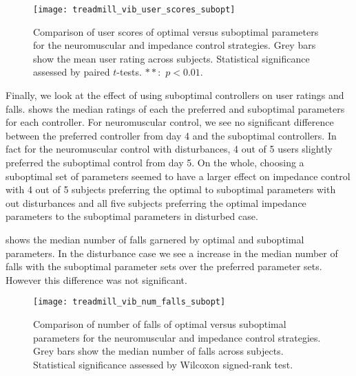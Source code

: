 \begin{figure}[t]
    \centering 
    \texttt{[image: treadmill\_vib\_user\_scores\_subopt]}
    \caption{Comparison of user scores of optimal versus suboptimal parameters
    for the neuromuscular and impedance control strategies. Grey bars show the
    mean user rating across subjects. Statistical significance assessed by
    paired $t$-tests. $**$:~$p <
    0.01$.}\label{fig:treadmill_exp_user_ratings_subopt}
\end{figure}
Finally, we look at the effect of using suboptimal controllers on user ratings
and falls.  shows the median ratings of
each the preferred and suboptimal parameters for each controller. For
neuromuscular control, we see no significant difference between the preferred
controller from day 4 and the suboptimal controllers. In fact for the
neuromuscular control with disturbances, 4 out of 5 users slightly preferred the
suboptimal control from day 5. On the whole, choosing a suboptimal set of
parameters seemed to have a larger effect on impedance control with 4 out of 5
subjects preferring the optimal to suboptimal parameters with out disturbances
and all five subjects preferring the optimal impedance parameters to the
suboptimal parameters in disturbed case.

 shows the median number of falls
garnered by optimal and suboptimal parameters. In the disturbance case we see a
increase in the median number of falls with the suboptimal parameter sets over
the preferred parameter sets. However this difference was not significant.

\begin{figure}[b]
    \centering 
    \texttt{[image: treadmill\_vib\_num\_falls\_subopt]}
    \caption{Comparison of number of falls of optimal versus suboptimal
    parameters for the neuromuscular and impedance control strategies. Grey bars
    show the median number of falls across subjects. Statistical significance
    assessed by Wilcoxon signed-rank
    test.}\label{fig:treadmill_exp_num_falls_subopt}
\end{figure}

